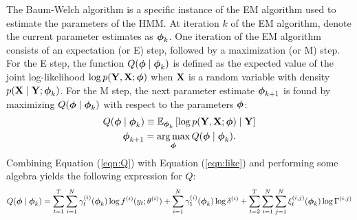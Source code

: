The Baum-Welch algorithm is a specific instance of the EM algorithm used to estimate the parameters of the HMM. %
At iteration $k$ of the EM algorithm, denote the current parameter estimates as $\boldsymbol{\phi}_{k}$. One iteration of the EM algorithm consists of an expectation (or E) step, followed by a maximization (or M) step. For the E step, the function $Q(\boldsymbol{\phi} \mid \boldsymbol{\phi}_{k})$ is defined as the expected value of the joint log-likelihood $\log p(\mathbf{Y},\mathbf{X}; \boldsymbol{\phi})$ when $\mathbf{X}$ is a random variable with density $p(\mathbf{X} \mid \mathbf{Y} ; \boldsymbol{\phi}_{k})$. For the M step, the next parameter estimate $\boldsymbol{\phi}_{k+1}$ is found by maximizing $Q(\boldsymbol{\phi} \mid \boldsymbol{\phi}_{k})$ with respect to the parameters $\boldsymbol{\phi}$:
%
\begin{gather}
    Q(\boldsymbol{\phi} \mid \boldsymbol{\phi}_{k}) \equiv \mathbb{E}_{\boldsymbol{\phi}_{k}}\left[\log p(\mathbf{Y},\mathbf{X};\boldsymbol{\phi}) \mid \mathbf{Y} \right] \label{eqn:Q} \\
    \boldsymbol{\phi}_{k+1} = \operatorname*{arg\,max}_{\boldsymbol{\phi}} Q(\boldsymbol{\phi} \mid \boldsymbol{\phi}_{k}). \label{eqn:BW_update}
\end{gather}
%
Combining Equation (\ref{eqn:Q}) with Equation (\ref{eqn:like}) and performing some algebra yields the following expression for $Q$: %
\begin{equation}
    Q(\bfphi \mid \bfphi_{k}) %
    = \sum_{t = 1}^T \sum_{i=1}^N \gamma^{(i)}_t(\bfphi_{k}) \log f^{(i)}(y_t;\theta^{(i)}) + \sum_{i=1}^N \gamma^{(i)}_1(\bfphi_{k}) \log \delta^{(i)} + \sum_{t=2}^{T} \sum_{i=1}^N \sum_{j=1}^N \xi_t^{(i,j)}(\bfphi_{k}) \log \Gamma^{(i,j)}
    \label{eqn:Q_sum}
\end{equation}

